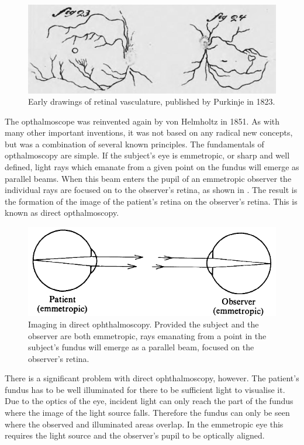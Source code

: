 \begin{figure}[H]
\centering
  \includegraphics{figures/retinal_vasc_drawings}
\caption{Early drawings of retinal vasculature, published by Purkinje in 1823.\cite{purkinjeje}}
\label{fig:retinal_drawings}
\end{figure}

The opthalmoscope was reinvented again by von Helmholtz in 1851.
\cite{vonhelm51}  As with many other important inventions, it was not
based on any radical new concepts, but was a combination of several
known principles.  The fundamentals of opthalmoscopy are simple.
If the subject's eye is emmetropic, or sharp and well defined, light rays
which emanate from a given point on the fundus will emerge as parallel
beams.  When this beam enters the pupil of an emmetropic observer the
individual rays are focused on to the observer's retina, as shown in
. The result is the formation of the image of the patient's
retina on the observer's retina.  This is known as direct opthalmoscopy.


\begin{figure}[H]
\centering
  \includegraphics{figures/direct_opthalmoscopy}
\caption{Imaging in direct ophthalmoscopy. Provided the subject and the observer are both emmetropic, rays emanating from a point in the subject's fundus will emerge as a parallel beam, focused on the observer's retina.\cite{colenbrander2013principles}}
\label{fig:direct_opthal}
\end{figure}

There is a significant problem with direct ophthalmoscopy, however.
The patient's fundus has to be well illuminated for there to be sufficient
 light to visualise it.  Due to the optics of the eye, incident light can only
reach the part of the fundus where the image of the light source falls.
Therefore the fundus can only be seen where the observed and illuminated
areas overlap.  In the emmetropic eye this requires the light source and
the observer's pupil to be optically aligned.

